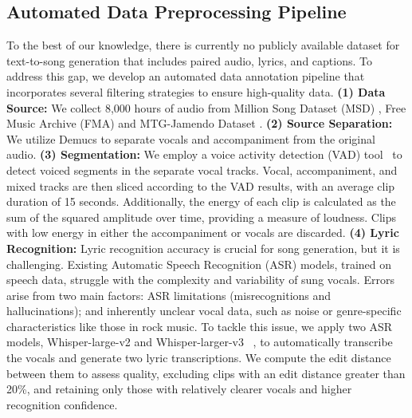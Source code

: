 \subsection{Automated Data Preprocessing Pipeline}
\label{sec:pipeline}
To the best of our knowledge, there is currently no publicly available dataset for text-to-song generation that includes paired audio, lyrics, and captions. To address this gap, we develop an automated data annotation pipeline that incorporates several filtering strategies to ensure high-quality data. 
\textbf{(1) Data Source:} We collect 8,000 hours of audio from Million Song Dataset (MSD) \cite{Bertin2011msd}, Free Music Archive (FMA) \cite{fma_challenge} and MTG-Jamendo Dataset \cite{bogdanov2019mtg}.
\textbf{(2) Source Separation:} We utilize Demucs \citep{rouard2022demucs} to separate vocals and accompaniment from the original audio. %
\textbf{(3) Segmentation:} We employ a voice activity detection (VAD) tool~\cite{gao2023funasr} to detect voiced segments in the separate vocal tracks. 
Vocal, accompaniment, and mixed tracks are then sliced according to the VAD results, with an average clip duration of 15 seconds. 
Additionally, the energy of each clip is calculated as the sum of the squared amplitude over time, providing a measure of loudness. Clips with low energy in either the accompaniment or vocals are discarded.
\textbf{(4) Lyric Recognition:} Lyric recognition accuracy is crucial for song generation, but it is challenging. Existing Automatic Speech Recognition (ASR) models, trained on speech data, struggle with the complexity and variability of sung vocals. 
Errors arise from two main factors: ASR limitations (misrecognitions and hallucinations); and inherently unclear vocal data, such as noise or genre-specific characteristics like those in rock music.
To tackle this issue, we apply two ASR models, Whisper-large-v2 and Whisper-larger-v3 ~\citep{radford2022whisper}, to automatically transcribe the vocals and generate two lyric transcriptions. We compute the edit distance between them to assess quality, excluding clips with an edit distance greater than 20\%, and retaining only those with relatively clearer vocals and higher recognition confidence.
